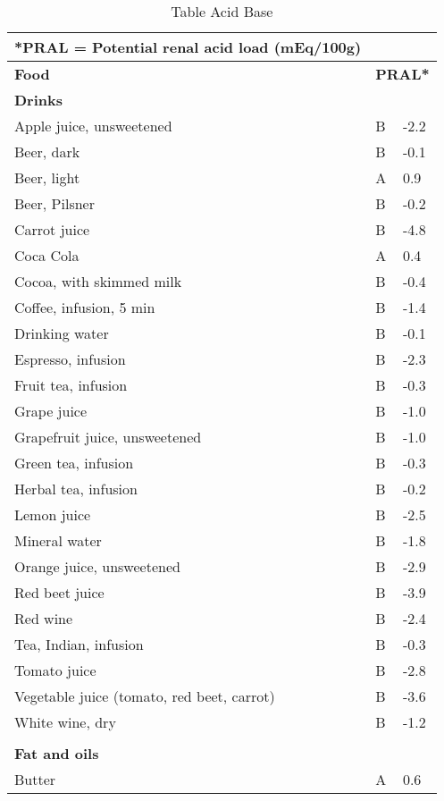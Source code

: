 \documentclass[../main.tex]{subfiles}
\begin{document}

\clearpage
\thispagestyle{empty}
  \centering 
\begin{longtable}{p{7cm}p{0.5cm}p{1cm}}
  \caption{Table Acid Base}\label{table:acidbase} \\
\footnotesize{*PRAL = Potential renal acid load (mEq/100g)}  \\
\toprule
    \textbf{Food}  &  \multicolumn{2}{l}{\textbf{PRAL*}}  \\
    \midrule
    \endhead
\multicolumn{3}{l}{\textbf{Drinks}}  \\
Apple juice, unsweetened   & B   & -2.2 \\
Beer, dark   & B   & -0.1 \\
Beer, light   & A   & 0.9 \\
Beer, Pilsner   & B   & -0.2 \\
Carrot juice  & B   & -4.8 \\
Coca Cola   & A   & 0.4 \\
Cocoa, with skimmed milk  & B   & -0.4 \\
Coffee, infusion, 5 min   & B   & -1.4 \\
Drinking water  & B   & -0.1 \\
Espresso, infusion   & B   & -2.3 \\
Fruit tea, infusion   & B  & -0.3 \\
Grape juice  & B   & -1.0 \\
Grapefruit juice, unsweetened   & B   & -1.0 \\
Green tea, infusion   & B   & -0.3 \\
Herbal tea, infusion   & B   & -0.2 \\
Lemon juice  & B   & -2.5 \\
Mineral water  & B   & -1.8 \\
Orange juice, unsweetened  & B   & -2.9 \\
Red beet juice  & B   & -3.9 \\
Red wine  & B   & -2.4 \\
Tea, Indian, infusion  & B   & -0.3 \\
Tomato juice  & B   & -2.8 \\
Vegetable juice (tomato, red beet, carrot)   & B   & -3.6 \\
White wine, dry  & B   & -1.2 \\
 \\
\multicolumn{3}{l}{\textbf{Fat and oils}}  \\
Butter  & A   & 0.6 \\

\end{longtable}
\end{document}
